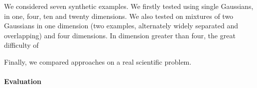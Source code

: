 \documentclass{article} %
\begin{document}
We considered seven synthetic examples. We firstly tested using single Gaussians, in one, four, ten and twenty dimensions. We also tested on mixtures of two Gaussians in one dimension (two examples, alternately widely separated and overlapping) and four dimensions. In dimension greater than four, the great difficulty of 

Finally, we compared approaches on a real scientific problem. 




\paragraph{Evaluation}
\end{document}
